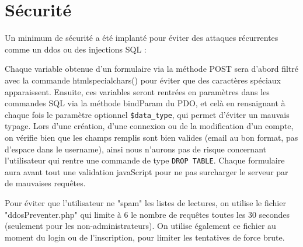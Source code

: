 \section{Sécurité}
    Un minimum de sécurité a été implanté pour éviter des attaques récurrentes comme un ddos ou des injections SQL :

Chaque variable obtenue d'un formulaire via la méthode POST sera d'abord filtré avec la commande htmlspecialchars() pour éviter que des caractères spéciaux apparaissent. Ensuite, ces variables seront rentrées en paramètres dans les commandes SQL via la méthode bindParam du PDO, et celà en rensaignant à chaque fois le paramètre optionnel \texttt{\$data\_type}, qui permet d'éviter un mauvais typage.\newline
Lors d'une création, d'une connexion ou de la modification d'un compte, on vérifie bien que les champs remplis sont bien valides (email au bon format, pas d'espace dans le username), ainsi nous n'aurons pas de risque concernant l'utilisateur qui rentre une commande de type \texttt{DROP TABLE}.
Chaque formulaire aura avant tout une validation javaScript pour ne pas surcharger le serveur par de mauvaises requêtes.


Pour éviter que l'utilisateur ne "spam" les listes de lectures, on utilise le fichier "ddosPreventer.php" qui limite à 6 le nombre de requêtes toutes les 30 secondes (seulement pour les non-administrateurs).
On utilise également ce fichier au moment du login ou de l'inscription, pour limiter les tentatives de force brute.

